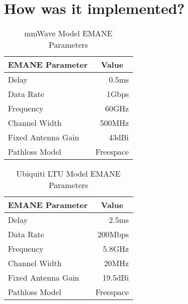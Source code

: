 \section{How was it implemented?}
\begin{table}
\centering
\caption{mmWave Model EMANE Parameters}
\begin{tabular}{lr} 
\hline
\multicolumn{1}{c}{EMANE Parameter} & \multicolumn{1}{c}{Value} \\ 
\hline
Delay & 0.5ms \\
Data Rate & 1Gbps \\
Frequency & 60GHz \\
Channel Width & 500MHz \\
Fixed Antenna Gain & 43dBi \\
Pathloss Model & \multicolumn{1}{l}{Freespace} \\
\hline
\end{tabular}
\label{mmwave_params}
\end{table}

\begin{table}
\centering
\caption{Ubiquiti LTU Model EMANE Parameters}
\begin{tabular}{lr} 
\hline
\multicolumn{1}{c}{EMANE Parameter} & \multicolumn{1}{c}{Value} \\ 
\hline
Delay & 2.5ms \\
Data Rate & 200Mbps \\
Frequency & 5.8GHz \\
Channel Width & 20MHz \\
Fixed Antenna Gain & 19.5dBi \\
Pathloss Model & \multicolumn{1}{l}{Freespace} \\
\hline
\end{tabular}
\label{ltu_params}
\end{table}



